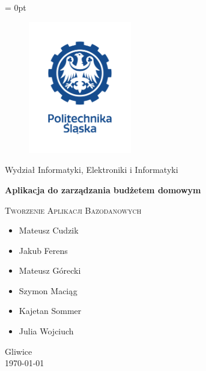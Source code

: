 \documentclass[12pt,a4paper,oneside]{article}
\begin{document}
{
\begin{titlepage}
    \fancyhf{}
    \headheight = 0pt
    \headsep =0pt
    \begin{center}
        \frenchspacing
        \thispagestyle{empty}
        \makeatletter
        \setlength{}
        \begin{figure}
            \centering
            \includegraphics[width=0.4\textwidth,keepaspectratio]{images/politechnika_sl_logo_pion_pl_rgb.png}
        \end{figure}
        \makeatother
        {\large
            Wydział Informatyki, Elektroniki i Informatyki}

        \vfill
        \textbf{\Huge
            Aplikacja do zarządzania budżetem domowym}
        \vspace*{1\baselineskip}

        {\large \scshape
            Tworzenie Aplikacji Bazodanowych}
        \vfill

        {\small
            \begin{itemize}
                \item Mateusz Cudzik\\
                \item Jakub Ferens\\
                \item Mateusz Górecki\\
                \item Szymon Maciąg\\
                \item Kajetan Sommer\\
                \item Julia Wojciuch
            \end{itemize}
            \vspace*{1\baselineskip}

            Gliwice\\
            \today
        }
        \vspace*{0\baselineskip}
    \end{center}
\end{titlepage}
}
\end{document}
